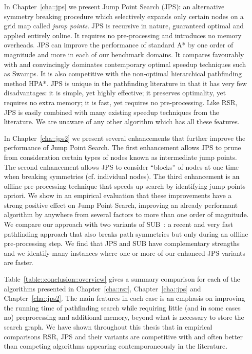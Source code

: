 In Chapter~\ref{cha::jps} we present Jump Point Search (JPS): an alternative
symmetry breaking procedure which selectively expands only certain nodes on
a grid map called \emph{jump points}.  JPS is recursive in nature,
guaranteed optimal and applied entirely online. It requires no pre-processing
and introduces no memory overheads. JPS can improve the performance of standard
A{*} by one order of magnitude and more in each of our benchmark domains. It
compares favourably with and convincingly dominates contemporary optimal
speedup techniques such as Swamps. It is also competitive with the non-optimal
hierarchical pathfinding method HPA{*}.  JPS is unique in the pathfinding
literature in that it has very few disadvantages: it is simple, yet highly
effective; it preserves optimality, yet requires no extra memory;  it is
fast, yet requires no pre-processing. Like RSR, JPS is easily combined with
many existing speedup techniques from the literature. We are unaware of any 
other algorithm which has all these features.

In Chapter~\ref{cha::jps2} we present several enhancements that further
improve the performance of Jump Point Search. The first enhancement allows JPS
to prune from consideration certain types of nodes known as intermediate jump
points.  The second enhancement allows JPS to consider ``blocks'' of nodes at
one time when breaking symmetries (cf. individual nodes).  The third
enhancement is an offline pre-processing technique that speeds up search by
identifying jump points apriori.  We show in an empirical evaluation that
these improvements have a strong positive effect on Jump Point Search,
improving an already performant algorithm by anywhere from several factors to
more than one order of magnitude.  We compare our approach with two variants
of SUB~\citep{urasKH13}: a recent and very fast pathfinding approach that also
breaks path symmetries but only during an offline pre-processing step. We find
that JPS and SUB have complementary strengths and we identify many instances
where one or more of our enhanced JPS variants are faster.



Table~\ref{table::conclusion::overview} gives a summary comparison for
each of the algorithms presented in Chapter~\ref{cha::rsr}, Chapter~\ref{cha::jps} 
and Chapter~\ref{cha::jps2}. The main features in each case is an emphasis
on improving the running time of pathfinding search while requiring little
(and in some cases no) preprocessing and additional memory, beyond what is 
necessary to store the search graph. We have shown throughout this thesis 
that in empirical comparisons RSR, JPS and their variants are competitive 
with and often better than competing algorithms appearing contemporaneously 
in the literature.

